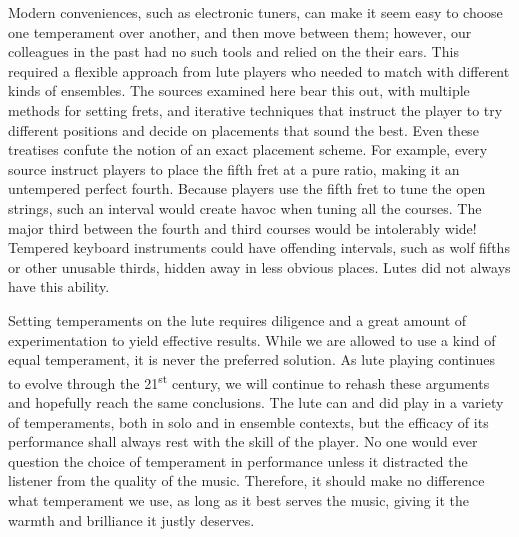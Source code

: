 Modern conveniences, such as electronic tuners, can make it seem easy to choose one temperament over
another, and then move between them; however, our colleagues in the past had no such tools and
relied on the their ears.  This required a flexible approach from lute players who needed to match
with different kinds of ensembles.  The sources examined here bear this out, with multiple methods
for setting frets, and iterative techniques that instruct the player to try different positions and
decide on placements that sound the best.  Even these treatises confute the notion of an exact
placement scheme. For example, every source instruct players to place the fifth fret at a pure
ratio, making it an untempered perfect fourth.  Because players use the fifth fret to tune the open
strings, such an interval would create havoc when tuning all the courses. The major third between
the fourth and third courses would be intolerably wide!  Tempered keyboard instruments could have
offending intervals, such as wolf fifths or other unusable thirds, hidden away in less obvious
places.  Lutes did not always have this ability.

Setting temperaments on the lute requires diligence and a great amount of experimentation to yield
effective results.  While we are allowed to use a kind of equal temperament, it is never the
preferred solution.  As lute playing continues to evolve through the 21\textsuperscript{st} century,
we will continue to rehash these arguments and hopefully reach the same conclusions. The lute can
and did play in a variety of temperaments, both in solo and in ensemble contexts, but the efficacy
of its performance shall always rest with the skill of the player. No one would ever question the
choice of temperament in performance unless it distracted the listener from the quality of the
music.  Therefore, it should make no difference what temperament we use, as long as it best serves
the music, giving it the warmth and brilliance it justly deserves.
